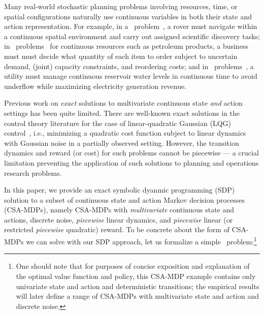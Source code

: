 \label{sec:intro}

Many real-world stochastic planning problems involving resources,
time, or spatial configurations naturally use continuous variables in
both their state and action representation.  For example, in a
\MarsRover\ problem~\cite{bresina02}, a rover must navigate within a
continuous spatial environment and carry out assigned scientific
discovery tasks; in \InventoryControl\ problems~\cite{Mahootchi2009}
for continuous resources such as petroleum products, a business must
must decide what quantity of each item to order subject to uncertain
demand, (joint) capacity constraints, and reordering costs; and in
\WaterReservoir\ problems~\cite{reservoir}, a utility must manage continuous
reservoir water levels in continuous time to avoid underflow 
while maximizing electricity generation revenue.

Previous work on \emph{exact} solutions to multivariate continuous
state \emph{and} action settings has been quite limited.  There are
well-known exact solutions in the control theory literature for the
case of linear-quadratic Gaussian (LQG) control~\cite{lqgc}, i.e.,
minimizing a quadratic cost function subject to linear dynamics with
Gaussian noise in a partially observed setting.  However, the
transition dynamics and reward (or cost) for such problems 
cannot be piecewise --- a crucial limitation preventing the application
of such solutions to planning and operations research problems. 

In this paper, we provide an exact symbolic dyanmic programming (SDP)
solution to a subset of continuous state and action Markov decision
processes (CSA-MDPs), namely CSA-MDPs with \emph{multivariate}
continuous state and actions, discrete noise, \emph{piecewise} linear
dynamics, and \emph{piecewise} linear (or restricted \emph{piecewise}
quadratic) reward.  To be concrete about the form of CSA-MDPs we can
solve with our SDP approach, let us formalize a simple \MarsRover\
problem:\footnote{One should note that for purposes of concise
exposition and explanation of the optimal value function and policy,
this CSA-MDP example contains only univariate state and action and
deterministic transitions; the empirical results will later define a
range of CSA-MDPs with multivariate state and action and discrete
noise.}

